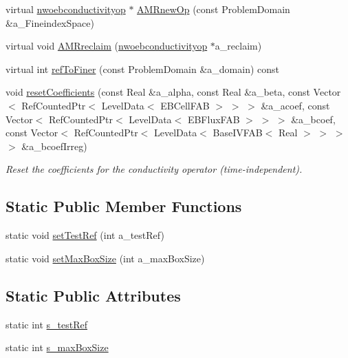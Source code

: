\begin{DoxyCompactItemize}
\item 
virtual \hyperlink{classnwoebconductivityop}{nwoebconductivityop} $\ast$ \hyperlink{classnwoebconductivityopfactory_ae15e0a499b748b6f9b18efbe675ba3a1}{A\+M\+Rnew\+Op} (const Problem\+Domain \&a\+\_\+\+Fineindex\+Space)
\item 
virtual void \hyperlink{classnwoebconductivityopfactory_a54c84b2cca735ac3abf4be1f84a97013}{A\+M\+Rreclaim} (\hyperlink{classnwoebconductivityop}{nwoebconductivityop} $\ast$a\+\_\+reclaim)
\item 
virtual int \hyperlink{classnwoebconductivityopfactory_a9f0557c5226bfc22002c40bf9ba8150c}{ref\+To\+Finer} (const Problem\+Domain \&a\+\_\+domain) const 
\item 
void \hyperlink{classnwoebconductivityopfactory_ac119b23231f7d1cdffc375682f034f52}{reset\+Coefficients} (const Real \&a\+\_\+alpha, const Real \&a\+\_\+beta, const Vector$<$ Ref\+Counted\+Ptr$<$ Level\+Data$<$ E\+B\+Cell\+F\+AB $>$ $>$ $>$ \&a\+\_\+acoef, const Vector$<$ Ref\+Counted\+Ptr$<$ Level\+Data$<$ E\+B\+Flux\+F\+AB $>$ $>$ $>$ \&a\+\_\+bcoef, const Vector$<$ Ref\+Counted\+Ptr$<$ Level\+Data$<$ Base\+I\+V\+F\+AB$<$ Real $>$ $>$ $>$ $>$ \&a\+\_\+bcoef\+Irreg)
\begin{DoxyCompactList}\small\item\em Reset the coefficients for the conductivity operator (time-\/independent). \end{DoxyCompactList}\end{DoxyCompactItemize}
\subsection*{Static Public Member Functions}
\begin{DoxyCompactItemize}
\item 
static void \hyperlink{classnwoebconductivityopfactory_aac0a44c85a8ce1b33ab96a1401109508}{set\+Test\+Ref} (int a\+\_\+test\+Ref)
\item 
static void \hyperlink{classnwoebconductivityopfactory_aac879f211bdf21e5be0aa2fae48bc083}{set\+Max\+Box\+Size} (int a\+\_\+max\+Box\+Size)
\end{DoxyCompactItemize}
\subsection*{Static Public Attributes}
\begin{DoxyCompactItemize}
\item 
static int \hyperlink{classnwoebconductivityopfactory_a36409fd2d7379a11d128ee561206787f}{s\+\_\+test\+Ref}
\item 
static int \hyperlink{classnwoebconductivityopfactory_a4bd3b73eb5242930d37b33281cee9bc7}{s\+\_\+max\+Box\+Size}
\end{DoxyCompactItemize}
